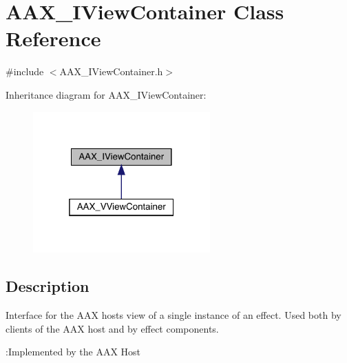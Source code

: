\hypertarget{a01889}{}\section{A\+A\+X\+\_\+\+I\+View\+Container Class Reference}
\label{a01889}


{\ttfamily \#include $<$A\+A\+X\+\_\+\+I\+View\+Container.\+h$>$}



Inheritance diagram for A\+A\+X\+\_\+\+I\+View\+Container\+:
\nopagebreak
\begin{figure}[H]
\begin{center}
\leavevmode
\includegraphics[width=193pt]{a01888}
\end{center}
\end{figure}


\subsection{Description}
Interface for the A\+AX host\textquotesingle{}s view of a single instance of an effect. Used both by clients of the A\+AX host and by effect components. 

\begin{DoxyRefDesc}{\+:\+Implemented by the A\+A\+X Host}
\item[\mbox{\hyperlink{a00790__aax_host_implementation000013}{\+:\+Implemented by the A\+A\+X Host}}]\end{DoxyRefDesc}
